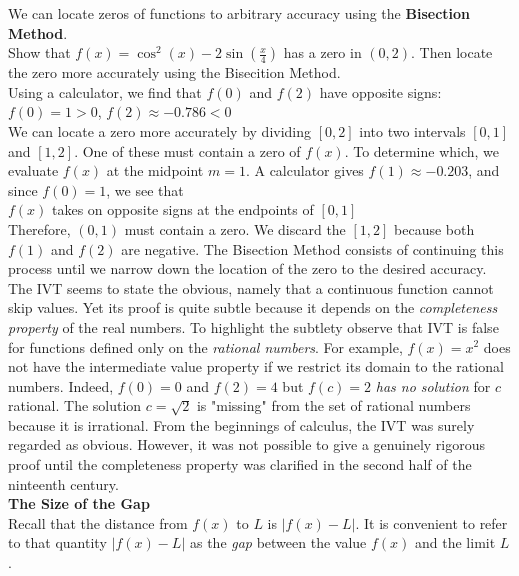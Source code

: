 \documentclass{article}
\begin{document}
	We can locate zeros of functions to arbitrary accuracy using the \textbf{Bisection Method}.\\

	Show that $f(x) = \cos^2(x) - 2\sin(\frac{x}{4})$ has a zero in $(0, 2)$. Then locate the zero more accurately using the Bisecition Method.\\

	Using a calculator, we find that $f(0)$ and $f(2)$ have opposite signs: $f(0) = 1 > 0$, $f(2) \approx -0.786 < 0$\\

	We can locate a zero more accurately by dividing $[0, 2]$ into two intervals $[0, 1]$ and $[1, 2]$. One of these must contain a zero of $f(x)$. To determine which, we evaluate $f(x)$ at the midpoint $m = 1$. A calculator gives $f(1) \approx -0.203$, and since $f(0) = 1$, we see that\\

	$f(x)$ takes on opposite signs at the endpoints of $[0, 1]$\\

	Therefore, $(0, 1)$ must contain a zero. We discard the $[1, 2]$ because both $f(1)$ and $f(2)$ are negative. The Bisection Method consists of continuing this process until we narrow down the location of the zero to the desired accuracy.\\

	The IVT seems to state the obvious, namely that a continuous function cannot skip values. Yet its proof is quite subtle because it depends on the \textit{completeness property} of the real numbers. To highlight the subtlety observe that IVT is false for functions defined only on the \textit{rational numbers}. For example, $f(x) = x^2$ does not have the intermediate value property if we restrict its domain to the rational numbers. Indeed, $f(0) = 0$ and $f(2) = 4$ but $f(c) = 2$ \textit{has no solution} for $c$ rational. The solution $c = \sqrt{2}$ is "missing" from the set of rational numbers because it is irrational. From the beginnings of calculus, the IVT was surely regarded as obvious. However, it was not possible to give a genuinely rigorous proof until the completeness property was clarified in the second half of the ninteenth century.\\

	\textbf{The Size of the Gap}\\
	Recall that the distance from $f(x)$ to $L$ is $\lvert f(x) - L\rvert$. It is convenient to refer to that quantity $\lvert f(x) - L\rvert$ as the \textit{gap} between the value $f(x)$ and the limit $L$.\\
\end{document}
